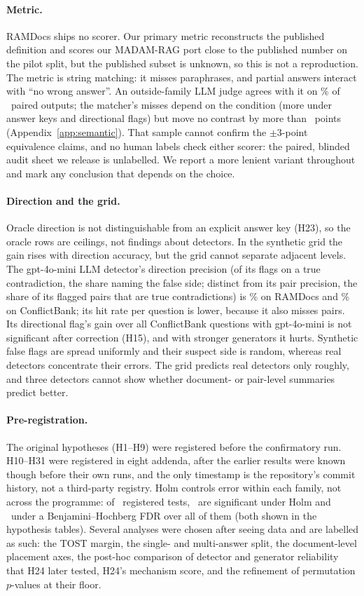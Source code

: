 \paragraph{Metric.} RAMDocs ships no scorer. Our primary metric reconstructs the published definition and scores our
MADAM-RAG port close to the published number on the pilot split, but the published subset is unknown, so this is not a
reproduction. The metric is string matching: it misses paraphrases, and partial answers interact with ``no wrong
answer''. An outside-family LLM judge agrees with it on \semAgree\% of \semN\ paired outputs; the matcher's misses
depend on the condition (more under answer keys and directional flags) but move no contrast by more than \semDidMax\
points (Appendix~\ref{app:semantic}). That sample cannot confirm the $\pm$3-point equivalence claims, and no human
labels check either scorer: the paired, blinded audit sheet we release is unlabelled. We report a more lenient variant throughout and mark any conclusion that depends on the choice.

\paragraph{Direction and the grid.} Oracle direction is not distinguishable from an explicit answer key (H23), so the
oracle rows are ceilings, not findings about detectors. In the synthetic grid the gain rises with direction accuracy, but the grid cannot separate adjacent levels. The gpt-4o-mini LLM
detector's direction precision (of its flags on a true contradiction, the share naming the false side; distinct from
its pair precision, the share of its flagged pairs that are true contradictions) is \dirAccLlm\% on RAMDocs and
\cbDirAccLlm\% on ConflictBank; its hit rate per question is lower, because it also misses pairs. Its
directional flag's gain over all ConflictBank questions with gpt-4o-mini is not significant after correction (H15),
and with stronger generators it hurts. Synthetic false flags are spread uniformly and their suspect side is random, whereas
real detectors concentrate their errors. The grid predicts real detectors only roughly, and three detectors cannot
show whether document- or pair-level summaries predict better.

\paragraph{Pre-registration.} The original hypotheses (H1--H9) were registered before the confirmatory run. H10--H31
were registered in eight addenda, after the earlier results were known though before their own runs, and the only
timestamp is the repository's commit history, not a third-party registry. Holm controls error within each family, not
across the programme: of \fdrN\ registered tests, \fdrHolm\ are significant under Holm and \fdrBH\ under a
Benjamini--Hochberg FDR over all of them (both shown in the hypothesis tables). Several analyses were chosen after seeing
data and are labelled as such: the TOST margin, the single- and multi-answer split, the document-level placement
axes, the post-hoc comparison of detector and
generator reliability that H24 later tested, H24's mechanism score, and the refinement of permutation $p$-values at
their floor.

